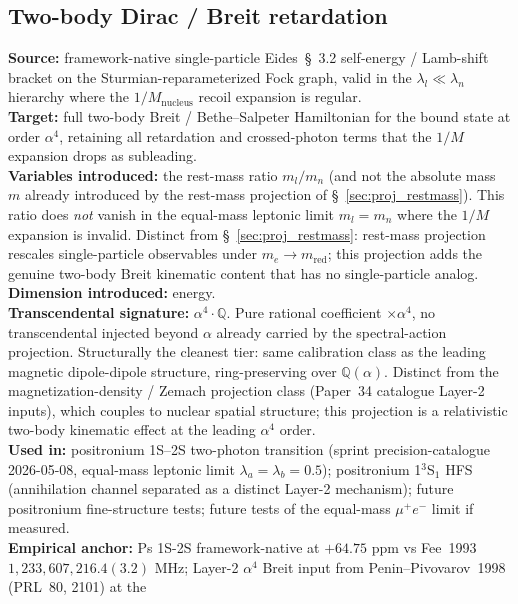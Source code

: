 \documentclass[11pt]{article}
\begin{document}
\subsection{Two-body Dirac / Breit retardation}
\label{sec:proj_breit_retardation}
\textbf{Source:} framework-native single-particle Eides~\S~3.2
self-energy / Lamb-shift bracket on the Sturmian-reparameterized
Fock graph, valid in the $\lambda_l \ll \lambda_n$ hierarchy where the
$1/M_\text{nucleus}$ recoil expansion is regular.\\
\textbf{Target:} full two-body Breit / Bethe--Salpeter Hamiltonian for
the bound state at order $\alpha^4$, retaining all retardation and
crossed-photon terms that the $1/M$ expansion drops as subleading.\\
\textbf{Variables introduced:} the rest-mass ratio $m_l/m_n$ (and not
the absolute mass~$m$ already introduced by the rest-mass projection
of \S~\ref{sec:proj_restmass}).  This ratio does \emph{not} vanish in
the equal-mass leptonic limit $m_l = m_n$ where the $1/M$ expansion
is invalid.  Distinct from \S~\ref{sec:proj_restmass}: rest-mass
projection rescales single-particle observables under
$m_e \to m_\text{red}$; this projection adds the genuine two-body
Breit kinematic content that has no single-particle analog.\\
\textbf{Dimension introduced:} energy.\\
\textbf{Transcendental signature:} $\alpha^4 \cdot \mathbb{Q}$.  Pure
rational coefficient $\times \alpha^4$, no transcendental injected
beyond $\alpha$ already carried by the spectral-action projection.
Structurally the cleanest tier: same calibration class as the leading
magnetic dipole-dipole structure, ring-preserving over
$\mathbb{Q}(\alpha)$.  Distinct from the magnetization-density /
Zemach projection class (Paper~34 catalogue Layer-2 inputs), which
couples to nuclear spatial structure; this projection is a relativistic
two-body kinematic effect at the leading $\alpha^4$ order.\\
\textbf{Used in:} positronium 1S--2S two-photon transition (sprint
precision-catalogue 2026-05-08, equal-mass leptonic limit
$\lambda_a = \lambda_b = 0.5$); positronium 1$^3$S$_1$ HFS (annihilation
channel separated as a distinct Layer-2 mechanism); future positronium
fine-structure tests; future tests of the equal-mass $\mu^+ e^-$
limit if measured.\\
\textbf{Empirical anchor:} Ps 1S-2S framework-native at $+64.75$ ppm
vs Fee~1993 $1{,}233{,}607{,}216.4(3.2)$ MHz; Layer-2 $\alpha^4$
Breit input from Penin--Pivovarov~1998 (PRL~80, 2101) at the
\end{document}
